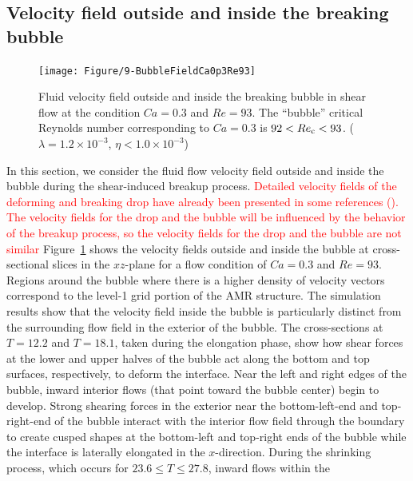 \documentclass{elsarticle}
\begin{document}
\subsection{Velocity field outside and inside the breaking bubble}
%
\begin{figure}[h!]
  \centering
  \texttt{[image: Figure/9-BubbleFieldCa0p3Re93]}
  \caption{Fluid velocity field outside and inside the breaking bubble in
           shear flow at the condition $Ca=0.3$ and $Re=93$.
	   The ``bubble'' 
	   critical Reynolds number corresponding to $Ca=0.3$ is
	   $92<Re_{\rm c}<93$.
           ($\lambda = 1.2 \times 10^{-3}$, $\eta < 1.0 \times 10^{-3}$) 
	   }
  \label{fig:BubbleFieldCa0p3Re93}
\end{figure}
%
In this section, we consider the fluid flow velocity field outside and inside
the bubble during the shear-induced breakup process.
\textcolor{red}
{
Detailed velocity fields of the deforming and breaking drop have already been presented in 
some references (\citet{LiRenRen00, RenCri01-1}).
The velocity fields for the drop and the bubble will be influenced by the behavior of the 
breakup process, so the velocity fields for the drop and the bubble are not similar
}
Figure~\ref{fig:BubbleFieldCa0p3Re93} shows the velocity fields outside and
inside the bubble at cross-sectional slices in the $xz$-plane for a flow
condition of $Ca = 0.3$ and $Re = 93$.  Regions around the bubble where there
is a higher density of velocity vectors correspond to the level-1 grid portion
of the AMR structure.  The simulation results show that the velocity field
inside the bubble is particularly distinct from the surrounding flow field in
the exterior of the bubble.  The cross-sections at $T=12.2$ and $T=18.1$, taken
during the elongation phase, show how shear forces at the lower and upper
halves of the bubble act along the bottom and top surfaces, respectively, to
deform the interface.  Near the left and right edges of the bubble, inward
interior flows (that point toward the bubble center) begin to develop.  Strong
shearing forces in the exterior near the bottom-left-end and top-right-end of
the bubble interact with the interior flow field through the boundary to create
cusped shapes at the bottom-left and top-right ends of the bubble while the
interface is laterally elongated in the $x$-direction.  During the shrinking
process, which occurs for $23.6 \leq T \leq 27.8$, inward flows within the
\end{document}
